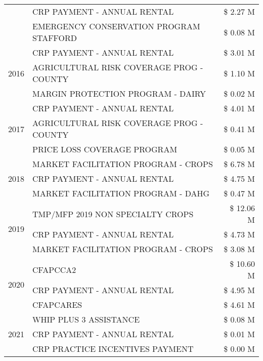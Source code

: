 \begin{tabular}{llr}
 & CRP PAYMENT - ANNUAL RENTAL & \$ 2.27 M \\
 & EMERGENCY CONSERVATION PROGRAM STAFFORD & \$ 0.08 M \\
\cline{1-3}
\multirow[t]{3}{*}{2016} & CRP PAYMENT - ANNUAL RENTAL & \$ 3.01 M \\
 & AGRICULTURAL RISK COVERAGE PROG - COUNTY & \$ 1.10 M \\
 & MARGIN PROTECTION PROGRAM - DAIRY & \$ 0.02 M \\
\cline{1-3}
\multirow[t]{3}{*}{2017} & CRP PAYMENT - ANNUAL RENTAL & \$ 4.01 M \\
 & AGRICULTURAL RISK COVERAGE PROG - COUNTY & \$ 0.41 M \\
 & PRICE LOSS COVERAGE PROGRAM & \$ 0.05 M \\
\cline{1-3}
\multirow[t]{3}{*}{2018} & MARKET FACILITATION PROGRAM - CROPS & \$ 6.78 M \\
 & CRP PAYMENT - ANNUAL RENTAL & \$ 4.75 M \\
 & MARKET FACILITATION PROGRAM - DAHG & \$ 0.47 M \\
\cline{1-3}
\multirow[t]{3}{*}{2019} & TMP/MFP 2019 NON SPECIALTY CROPS & \$ 12.06 M \\
 & CRP PAYMENT - ANNUAL RENTAL & \$ 4.73 M \\
 & MARKET FACILITATION PROGRAM - CROPS & \$ 3.08 M \\
\cline{1-3}
\multirow[t]{3}{*}{2020} & CFAPCCA2 & \$ 10.60 M \\
 & CRP PAYMENT - ANNUAL RENTAL & \$ 4.95 M \\
 & CFAPCARES & \$ 4.61 M \\
\cline{1-3}
\multirow[t]{3}{*}{2021} & WHIP PLUS 3 ASSISTANCE & \$ 0.08 M \\
 & CRP PAYMENT - ANNUAL RENTAL & \$ 0.01 M \\
 & CRP PRACTICE INCENTIVES PAYMENT & \$ 0.00 M \\
\cline{1-3}
\bottomrule
\end{tabular}
